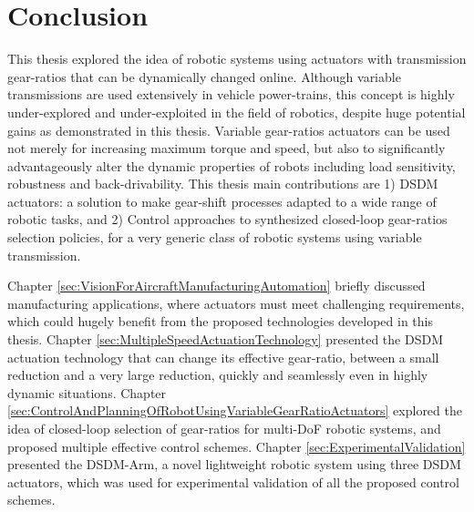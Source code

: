 \chapter{Conclusion}
\label{sec:Conclusion}








This thesis explored the idea of robotic systems using actuators with transmission gear-ratios that can be dynamically changed online. Although variable transmissions are used extensively in vehicle power-trains, this concept is highly under-explored and under-exploited in the field of robotics, despite huge potential gains as demonstrated in this thesis. Variable gear-ratios actuators can be used not merely for increasing maximum torque and speed, but also to significantly advantageously alter the dynamic properties of robots including load sensitivity, robustness and back-drivability. This thesis main contributions are 1) DSDM actuators: a solution to make gear-shift processes adapted to a wide range of robotic tasks, and 2) Control approaches to synthesized closed-loop gear-ratios selection policies, for a very generic class of robotic systems using variable transmission.

%
Chapter \ref{sec:VisionForAircraftManufacturingAutomation} briefly discussed manufacturing applications, where actuators must meet challenging requirements, which could hugely benefit from the proposed technologies developed in this thesis. 
%
Chapter \ref{sec:MultipleSpeedActuationTechnology} presented the DSDM actuation technology that can change its effective gear-ratio, between a small reduction and a very large reduction, quickly and seamlessly even in highly dynamic situations. 
%
Chapter \ref{sec:ControlAndPlanningOfRobotUsingVariableGearRatioActuators} explored the idea of closed-loop selection of gear-ratios for multi-DoF robotic systems, and proposed multiple effective control schemes.
%
Chapter \ref{sec:ExperimentalValidation} presented the DSDM-Arm, a novel lightweight robotic system using three DSDM actuators, which was used for experimental validation of all the proposed control schemes. %


